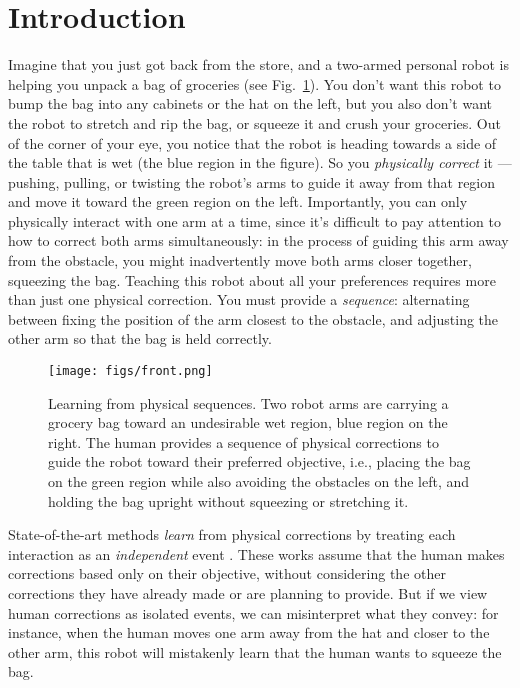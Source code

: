 \section{Introduction}
\label{intro}

Imagine that you just got back from the store, and a two-armed personal robot is helping you unpack a bag of groceries (see Fig.~\ref{fig:front}). You don't want this robot to bump the bag into any cabinets or the hat on the left, but you also don't want the robot to stretch and rip the bag, or squeeze it and crush your groceries. Out of the corner of your eye, you notice that the robot is heading towards a side of the table that is wet (the blue region in the figure). So you \textit{physically correct} it --- pushing, pulling, or twisting the robot's arms to guide it away from that region and move it toward the green region on the left. Importantly, you can only physically interact with one arm at a time, since it's difficult to pay attention to how to correct both arms simultaneously: in the process of guiding this arm away from the obstacle, you might inadvertently move both arms closer together, squeezing the bag. Teaching this robot about all your preferences requires more than just one physical correction. You must provide a \textit{sequence}: alternating between fixing the position of the arm closest to the obstacle, and adjusting the other arm so that the bag is held correctly.

\begin{figure}[t]
    \vspace{0.5em}
	\begin{center}
		\texttt{[image: figs/front.png]}

		\caption{Learning from physical sequences. Two robot arms are carrying a grocery bag toward an undesirable wet region, blue region on the right. The human provides a sequence of physical corrections to guide the robot toward their preferred objective, i.e., placing the bag on the green region while also avoiding the obstacles on the left, and holding the bag upright without squeezing or stretching it. }

		\label{fig:front}
	\end{center}
	
	\vspace{-2em}
	
\end{figure}

State-of-the-art methods \textit{learn} from physical corrections by treating each interaction as an \textit{independent} event \cite{bajcsy2017learning, bajcsy2018learning, losey2018including, bobu2020quantifying}. These works assume that the human makes corrections based only on their objective, without considering the other corrections they have already made or are planning to provide. But if we view human corrections as isolated events, we can misinterpret what they convey: for instance, when the human moves one arm away from the hat and closer to the other arm, this robot will mistakenly learn that the human wants to squeeze the bag.

